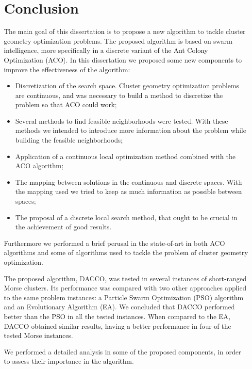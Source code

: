 \chapter{Conclusion}
\label{chap:conclusions}


The main goal of this dissertation is to propose a new algorithm to tackle cluster geometry optimization problems. The proposed algorithm is based on swarm intelligence, more specifically in a discrete variant of the Ant Colony Optimization (ACO). In this dissertation we proposed some new components to improve the effectiveness of the algorithm:
\begin{itemize}
	\item Discretization of the search space. Cluster geometry optimization problems are continuous, and was necessary to build a method to discretize the problem so that ACO could work;
	\item Several methods to find feasible neighborhoods were tested. With these methods we intended to introduce more information about the problem while building the feasible neighborhoods;
	\item Application of a continuous local optimization method combined with the ACO algorithm;
	\item The mapping between solutions in the continuous and discrete spaces. With the mapping used we tried to keep as much information as possible between spaces;
	\item The proposal of a discrete local search method, that ought to be crucial in the achievement of good results.
\end{itemize}

Furthermore we performed a brief perusal in the state-of-art in both ACO algorithms and some of algorithms used to tackle the problem of cluster geometry optimization.

The proposed algorithm, DACCO, was tested in several instances of short-ranged Morse clusters. Its performance was compared with two other approaches applied to the same problem instances: a Particle Swarm Optimization (PSO) algorithm and an Evolutionary Algorithm (EA). We concluded that DACCO performed better than the PSO in all the tested instances. When compared to the EA, DACCO obtained similar results, having a better performance in four of the tested Morse instances.

We performed a detailed analysis in some of the proposed components, in order to assess their importance in the algorithm.

